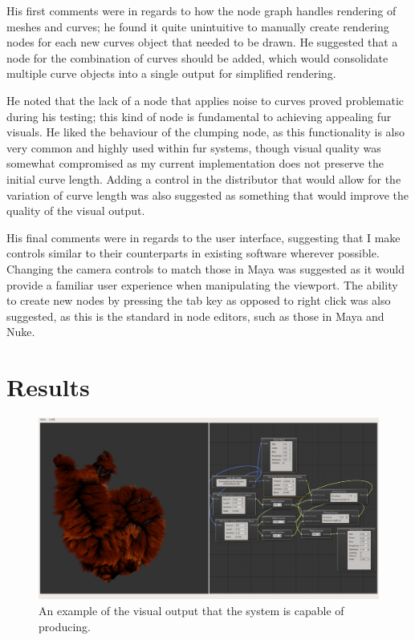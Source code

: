 \documentclass[]{acmsiggraph}
\begin{document}
His first comments were in regards to how the node graph handles rendering of meshes and curves; he found it quite unintuitive to manually create rendering nodes for each new curves object that needed to be drawn. He suggested that a node for the combination of curves should be added, which would consolidate multiple curve objects into a single output for simplified rendering.

He noted that the lack of a node that applies noise to curves proved problematic during his testing; this kind of node is fundamental to achieving appealing fur visuals. He liked the behaviour of the clumping node, as this functionality is also very common and highly used within fur systems, though visual quality was somewhat compromised as my current implementation does not preserve the initial curve length. Adding a control in the distributor that would allow for the variation of curve length was also suggested as something that would improve the quality of the visual output.

His final comments were in regards to the user interface, suggesting that I make controls similar to their counterparts in existing software wherever possible. Changing the camera controls to match those in Maya was suggested as it would provide a familiar user experience when manipulating the viewport. The ability to create new nodes by pressing the tab key as opposed to right click was also suggested, as this is the standard in node editors, such as those in Maya and Nuke.

\section{Results} \label{sec:results}

\begin{figure}[htbp]\centering
\includegraphics[width=1.0\linewidth]{images/test_0007}
\caption{\label{figure:screenshot} An example of the visual output that the system is capable of producing.}
\end{figure}
\end{document}
